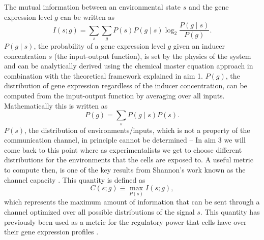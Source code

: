 The mutual information
between an environmental state $s$ and the gene expression level $g$ can be
written as
\begin{equation}
  I(s;g) = \sum_s \sum_g P(s) P(g \mid s) \log_2 \frac{P(g \mid s)}{P(g)}.
\end{equation}
$P(g \mid s)$, the probability of a gene expression level $g$
given an inducer concentration $s$ (the input-output function), is set by the
physics of the system and can be analytically derived using the chemical master
equation approach \cite{Shahrezaei2008, Swain2016} in combination with the
theoretical framework explained in aim 1. $P(g)$, the distribution of gene
expression regardless of the inducer concentration, can be computed from the
input-output function by averaging over all inputs. Mathematically this is
written as
\begin{equation}
  P(g) = \sum_s P(g \mid s) P(s).
\end{equation}
$P(s)$, the distribution of environments/inputs, which is not a property of the
communication channel, in principle cannot be determined -- In aim 3 we will
come back to this point where as experimentalists we get to choose different
distributions for the environments that the cells are exposed to. A useful
metric to compute then, is one of the key results from Shannon's work known as
the channel capacity \cite{Rhee2012a}. This quantity is defined as
\begin{equation}
  C(s; g) \equiv \max_{P(s)} I(s; g),
\end{equation}
which represents the maximum amount of information that can be sent through a
channel optimized over all possible distributions of the signal $s$.
This quantity has previously been used as a metric for the regulatory power that
cells have over their gene expression profiles \cite{Tkacik2008a, Rieckh2014}.

